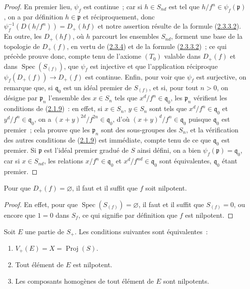 \begin{proof}
En premier lieu, $\psi_f$ est continue~; car si $h\in S_{nd}$ est tel que
$h/f^n\in\psi_f(\mathfrak{p})$, on a par définition
$h\in\mathfrak{p}$ et réciproquement, donc $\psi_f^{-1}(D(h/f^n))=D_+(hf)$
et notre assertion résulte de la formule
(\hyperref[II.2.3.3.2-fr]{2.3.3.2}). En outre, les $D_+(hf)$, où $h$
parcourt les ensembles $S_{nd}$, forment une base de la topologie de
$D_+(f)$, en vertu de (\hyperref[II.2.3.4-fr]{2.3.4}) et de la formule
(\hyperref[II.2.3.3.2-fr]{2.3.3.2})~; ce
qui précède prouve donc, compte tenu de l'axiome $(T_0)$ valable dans
$D_+(f)$ et dans $\operatorname{Spec}(S_{(f)})$, que $\psi_f$ est injective
et que l'application réciproque
$\psi_f(D_+(f))\longrightarrow D_+(f)$ est continue. Enfin, pour voir que
$\psi_f$ est surjective, on remarque que, si $\mathfrak{q}_0$ est un idéal
premier de $S_{(f)}$, et si, pour tout $n>0$, on désigne par
$\mathfrak{p}_n$ l'ensemble des $x\in S_n$ tels que
$x^d/f^n\in\mathfrak{q}_0$, les $\mathfrak{p}_n$ vérifient les conditions
de (\hyperref[II.2.1.9-fr]{2.1.9})~: en effet, si $x\in S_n$, $y\in S_n$
sont tels que $x^d/f^n\in\mathfrak{q}_0$ et
$y^d/f^n\in\mathfrak{q}_0$, on a
$(x+y)^{2d}/f^{2n}\in\mathfrak{q}_0$, d'où
$(x+y)^d/f^n\in\mathfrak{q}_0$ puisque $\mathfrak{q}_0$ est premier~;
cela prouve que les $\mathfrak{p}_n$ sont des sous-groupes des $S_n$, et la
vérification des autres conditions de
(\hyperref[II.2.1.9-fr]{2.1.9}) est immédiate, compte tenu de ce que
$\mathfrak{q}_0$ est premier. Si $\mathfrak{p}$ est l'idéal premier gradué
de $S$ ainsi défini, on a bien
$\psi_f(\mathfrak{p})=\mathfrak{q}_0$, car si $x\in S_{nd}$, les relations
$x/f^n\in\mathfrak{q}_0$ et $x^d/f^{nd}\in\mathfrak{q}_0$ sont
équivalentes, $\mathfrak{q}_0$ étant premier.
\end{proof}

\begin{corollary}[2.3.7]
\label{II.2.3.7-fr}
Pour que $D_+(f)=\varnothing$, il faut et il suffit que $f$ soit nilpotent.
\end{corollary}

\begin{proof}
En effet, pour que $\operatorname{Spec}(S_{(f)})=\varnothing$, il faut et
il suffit que $S_{(f)}=0$, ou encore que $1=0$ dans $S_f$, ce qui signifie
par définition que $f$ est nilpotent.
\end{proof}

\begin{corollary}[2.3.8]
\label{II.2.3.8-fr}
Soit $E$ une partie de $S_+$. Les conditions suivantes sont équivalentes~:
\begin{enumerate}
  \item[\textit{a)}] $V_+(E)=X=\operatorname{Proj}(S)$.
  \item[\textit{b)}] Tout élément de $E$ est nilpotent.
  \item[\textit{c)}] Les composants homogènes de tout élément de $E$ sont
    nilpotents.
\end{enumerate}
\end{corollary}

